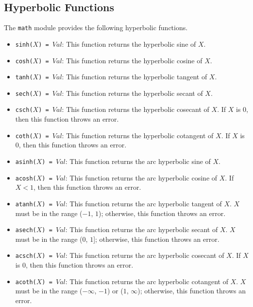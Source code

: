 \subsection{Hyperbolic Functions}
The \texttt{math} module provides the following hyperbolic functions.
\begin{itemize}
\item \texttt{sinh($X$) = $Val$}: This function returns the hyperbolic sine of $X$.
\item \texttt{cosh($X$) = $Val$}: This function returns the hyperbolic cosine of $X$.
\item \texttt{tanh($X$) = $Val$}: This function returns the hyperbolic tangent of $X$.
\item \texttt{sech($X$) = $Val$}: This function returns the hyperbolic secant of $X$. 
\item \texttt{csch($X$) = $Val$}: This function returns the hyperbolic cosecant of $X$.  If $X$ is $0$, then this function throws an error.
\item \texttt{coth($X$) = $Val$}: This function returns the hyperbolic cotangent of $X$.  If $X$ is $0$, then this function throws an error.
\item \texttt{asinh($X$) = $Val$}: This function returns the arc hyperbolic sine of $X$.
\item \texttt{acosh($X$) = $Val$}: This function returns the arc hyperbolic cosine of $X$.  If $X < 1$, then this function throws an error.
\item \texttt{atanh($X$) = $Val$}: This function returns the arc hyperbolic tangent of $X$.  $X$ must be in the range ($-1$, $1$); otherwise, this function throws an error.
\item \texttt{asech($X$) = $Val$}: This function returns the arc hyperbolic secant of $X$.  $X$ must be in the range ($0$, $1$]; otherwise, this function throws an error.
\item \texttt{acsch($X$) = $Val$}: This function returns the arc hyperbolic cosecant of $X$.  If $X$ is $0$, then this function throws an error.
\item \texttt{acoth($X$) = $Val$}: This function returns the arc hyperbolic cotangent of $X$.  $X$ must be in the range ($-\infty$, $-1$) or ($1$, $\infty$); otherwise, this function throws an error.
\end{itemize}

